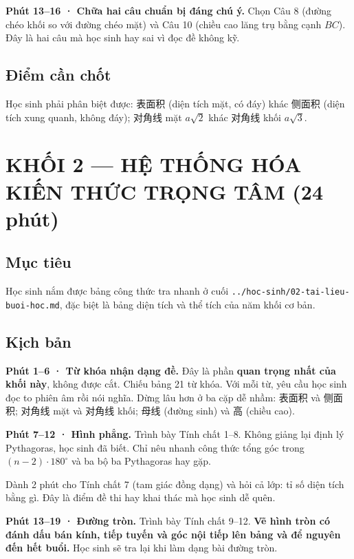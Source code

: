 \documentclass[11pt, a4paper]{article}
\begin{document}
\textbf{Phút 13–16 · Chữa hai câu chuẩn bị đáng chú ý.} Chọn Câu 8 (đường chéo khối so với đường chéo mặt) và Câu 10 (chiều cao lăng trụ bằng cạnh $BC$). Đây là hai câu mà học sinh hay sai vì đọc đề không kỹ.

\subsection{Điểm cần chốt}

Học sinh phải phân biệt được: 表面积 (diện tích mặt, có đáy) khác 侧面积 (diện tích xung quanh, không đáy); 对角线 mặt $a\sqrt{2}$ khác 对角线 khối $a\sqrt{3}$.

\section{KHỐI 2 — HỆ THỐNG HÓA KIẾN THỨC TRỌNG TÂM (24 phút)}

\subsection{Mục tiêu}

Học sinh nắm được bảng công thức tra nhanh ở cuối \texttt{../hoc-sinh/02-tai-lieu-buoi-hoc.md}, đặc biệt là bảng diện tích và thể tích của năm khối cơ bản.

\subsection{Kịch bản}

\textbf{Phút 1–6 · Từ khóa nhận dạng đề.} Đây là phần \textbf{quan trọng nhất của khối này}, không được cắt. Chiếu bảng 21 từ khóa. Với mỗi từ, yêu cầu học sinh đọc to phiên âm rồi nói nghĩa. Dừng lâu hơn ở ba cặp dễ nhầm: 表面积 và 侧面积; 对角线 mặt và 对角线 khối; 母线 (đường sinh) và 高 (chiều cao).

\textbf{Phút 7–12 · Hình phẳng.} Trình bày Tính chất 1–8. Không giảng lại định lý Pythagoras, học sinh đã biết. Chỉ nêu nhanh công thức tổng góc trong $(n-2) \cdot 180^\circ$ và ba bộ ba Pythagoras hay gặp.

Dành 2 phút cho Tính chất 7 (tam giác đồng dạng) và hỏi cả lớp: tỉ số diện tích bằng gì. Đây là điểm đề thi hay khai thác mà học sinh dễ quên.

\textbf{Phút 13–19 · Đường tròn.} Trình bày Tính chất 9–12. \textbf{Vẽ hình tròn có đánh dấu bán kính, tiếp tuyến và góc nội tiếp lên bảng và để nguyên đến hết buổi.} Học sinh sẽ tra lại khi làm dạng bài đường tròn.
\end{document}
